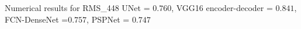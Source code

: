 	
Numerical results for RMS\_448
UNet = \(0.760\), VGG16 encoder-decoder = \(0.841\), FCN-DenseNet =\(0.757\), PSPNet = \(0.747\)
	
